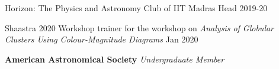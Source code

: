 

\begin{cvhonors}
  \cvhonor
    {Horizon: The Physics and Astronomy Club of IIT Madras} %
    {Head} %
    {} %
    {2019-20} %
    
  \cvhonor
    {Shaastra 2020} %
    {Workshop trainer for the workshop on \emph{Analysis of Globular Clusters Using Colour-Magnitude Diagrams}} %
    {} %
    {Jan 2020} %

\end{cvhonors}





\begin{small}\color{black}
\textbf{American Astronomical Society} \hspace{2mm} \textit{Undergraduate Member}
\end{small}\\
\vspace{0.5 mm}